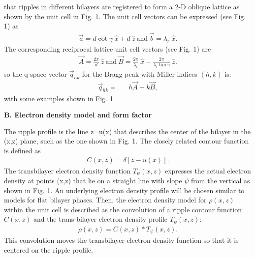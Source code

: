 \noindent
that ripples in different bilayers are registered to form a 
2-D oblique lattice as shown by the unit cell in Fig. 1.
The unit cell vectors can be expressed (see Fig. 1) as
\begin{eqnarray}
\label{realunit}
\vec{a} = d \cot \gamma\ \hat{x} + d\ \hat{z} \ \mbox{and}\ \vec{b} = \lambda_r\ \hat{x}.
\end{eqnarray}
The corresponding reciprocal lattice unit cell vectors (see Fig. 1) are 
\begin{eqnarray}
\label{reciunit}
\vec{A} = \frac{2 \pi}{d}\ \hat{z}\ \mbox{and}\ \vec{B} = \frac{2 \pi}{\lambda_r}\ \hat{x} - \frac{2 \pi}{\lambda_r \tan \gamma}\ \hat{z}.
\end{eqnarray}
so the q-space vector $\vec{q}_{hk}$ for the Bragg peak with Miller indices $(h,k)$
is:
\begin{eqnarray}
\label{qvector}
\vec{q}_{hk} =&& h \vec{A} + k \vec{B} ,
\end{eqnarray}
with some examples shown in Fig. 1.

\vspace{0.128in}
\noindent
{\bf B. Electron density model and form factor}
\vspace{0.128in}

The ripple profile is the line z=u(x) that describes the center of the bilayer 
in the (x,z) plane, such as the one shown in Fig. 1.  
The closely related contour function is defined as
\begin{eqnarray}
\label{contour}
C(x,z) = \delta [z - u(x)].
\end{eqnarray}
The transbilayer electron density function $T_{\psi}(x,z)$ expresses the
actual electron density at points (x,z) that lie on a straight line with
slope $\psi$ from the vertical as shown in Fig. 1.  An underlying electron
density profile will be chosen similar to models for flat bilayer phases.
Then, the electron density model for $\rho (x,z)$ within
the unit cell is described as the convolution of a ripple contour
function $C(x,z)$ and the trans-bilayer electron density profile $T_{\psi}(x,z)$:
\begin{eqnarray}
\label{model}
\rho (x,z) = C(x,z) \ast T_{\psi}(x,z).
\end{eqnarray}
This convolution moves the transbilayer electron density function so that
it is centered on the ripple profile.

